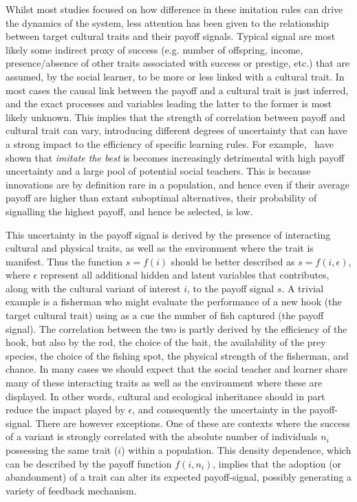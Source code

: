 \documentclass[3p,authoryear,twocolumn]{elsarticle} %
\begin{document}
Whilst most studies focused on how difference in these imitation rules can drive the dynamics of the system, less attention has been given to the relationship between target cultural traits and their payoff signals. Typical signal are most likely some indirect proxy of success (e.g. number of offspring, income, presence/absence of other traits associated with success or prestige, etc.)  that are assumed, by the social learner, to be more or less linked with a cultural trait. In most cases the causal link between the payoff and a cultural trait is just inferred, and the exact processes and variables leading the latter to the former is most likely unknown. This implies that the strength of correlation between payoff and cultural trait can vary, introducing different degrees of uncertainty that can have a strong impact to the efficiency of specific learning rules. For example,~\citet{crema_lake_inpress} have shown that \emph{imitate the best} is becomes increasingly detrimental with high payoff uncertainty and a large pool of potential social teachers. This is because innovations are by definition rare in a population, and hence even if their average payoff are higher than extant suboptimal alternatives, their probability of signalling the highest payoff, and hence be selected, is low.

This uncertainty in the payoff signal is derived by the presence of interacting cultural and physical traits, as well as the environment where the trait is manifest. Thus the function $s=f(i)$ should be better described as $s=f(i,\epsilon)$, where $\epsilon$ represent all additional hidden and latent variables that contributes, along with the cultural variant of interest $i$, to the payoff signal $s$. A trivial example is a fisherman who might evaluate the performance of a new hook (the target cultural trait) using as a cue the number of fish captured (the payoff signal). The correlation between the two is partly derived by the efficiency of the hook, but also by the rod, the choice of the bait, the availability of the prey species, the choice of the fishing spot, the physical strength of the fisherman, and chance. In many cases we should expect that the social teacher and learner share many of these interacting traits as well as the environment where these are displayed. In other words, cultural and ecological inheritance should in part reduce the impact played by $\epsilon$, and consequently the uncertainty in the payoff-signal. There are however exceptions. One of these are contexts where the success of a variant is strongly correlated with the absolute number of individuals $n_i$ possessing the same trait ($i$) within a population. This density dependence, which can be described by the payoff function $f(i,n_i)$, implies that the adoption (or abandonment) of a trait can alter its expected payoff-signal, possibly generating a variety of feedback mechanism.  
\end{document}
